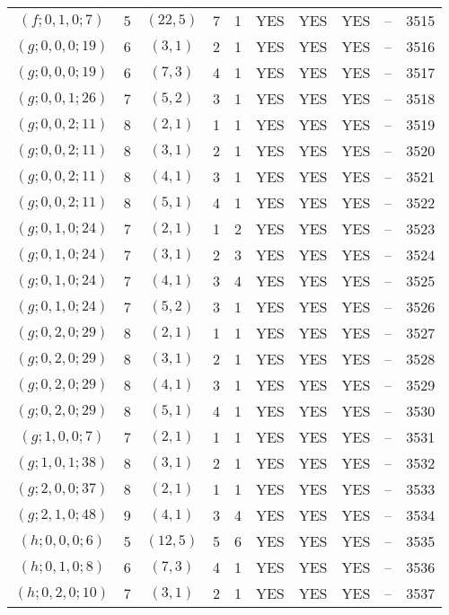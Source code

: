 \begin{longtable}{|c|c|c|c|c|c|c|c|c|c|}
$(f; 0, 1, 0; 7)$ & 5 & $(22, 5)$ & 7 & 1 & YES & YES & YES & -- & 3515\\
$(g; 0, 0, 0; 19)$ & 6 & $(3, 1)$ & 2 & 1 & YES & YES & YES & -- & 3516\\
$(g; 0, 0, 0; 19)$ & 6 & $(7, 3)$ & 4 & 1 & YES & YES & YES & -- & 3517\\
$(g; 0, 0, 1; 26)$ & 7 & $(5, 2)$ & 3 & 1 & YES & YES & YES & -- & 3518\\
$(g; 0, 0, 2; 11)$ & 8 & $(2, 1)$ & 1 & 1 & YES & YES & YES & -- & 3519\\
$(g; 0, 0, 2; 11)$ & 8 & $(3, 1)$ & 2 & 1 & YES & YES & YES & -- & 3520\\
$(g; 0, 0, 2; 11)$ & 8 & $(4, 1)$ & 3 & 1 & YES & YES & YES & -- & 3521\\
$(g; 0, 0, 2; 11)$ & 8 & $(5, 1)$ & 4 & 1 & YES & YES & YES & -- & 3522\\
$(g; 0, 1, 0; 24)$ & 7 & $(2, 1)$ & 1 & 2 & YES & YES & YES & -- & 3523\\
$(g; 0, 1, 0; 24)$ & 7 & $(3, 1)$ & 2 & 3 & YES & YES & YES & -- & 3524\\
$(g; 0, 1, 0; 24)$ & 7 & $(4, 1)$ & 3 & 4 & YES & YES & YES & -- & 3525\\
$(g; 0, 1, 0; 24)$ & 7 & $(5, 2)$ & 3 & 1 & YES & YES & YES & -- & 3526\\
$(g; 0, 2, 0; 29)$ & 8 & $(2, 1)$ & 1 & 1 & YES & YES & YES & -- & 3527\\
$(g; 0, 2, 0; 29)$ & 8 & $(3, 1)$ & 2 & 1 & YES & YES & YES & -- & 3528\\
$(g; 0, 2, 0; 29)$ & 8 & $(4, 1)$ & 3 & 1 & YES & YES & YES & -- & 3529\\
$(g; 0, 2, 0; 29)$ & 8 & $(5, 1)$ & 4 & 1 & YES & YES & YES & -- & 3530\\
$(g; 1, 0, 0; 7)$ & 7 & $(2, 1)$ & 1 & 1 & YES & YES & YES & -- & 3531\\
$(g; 1, 0, 1; 38)$ & 8 & $(3, 1)$ & 2 & 1 & YES & YES & YES & -- & 3532\\
$(g; 2, 0, 0; 37)$ & 8 & $(2, 1)$ & 1 & 1 & YES & YES & YES & -- & 3533\\
$(g; 2, 1, 0; 48)$ & 9 & $(4, 1)$ & 3 & 4 & YES & YES & YES & -- & 3534\\
$(h; 0, 0, 0; 6)$ & 5 & $(12, 5)$ & 5 & 6 & YES & YES & YES & -- & 3535\\
$(h; 0, 1, 0; 8)$ & 6 & $(7, 3)$ & 4 & 1 & YES & YES & YES & -- & 3536\\
$(h; 0, 2, 0; 10)$ & 7 & $(3, 1)$ & 2 & 1 & YES & YES & YES & -- & 3537\\

\end{longtable}
